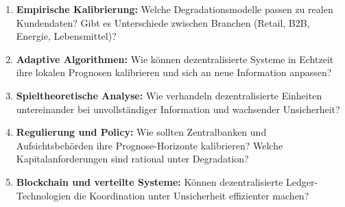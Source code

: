 \documentclass[12pt, a4paper, titlepage]{report}
\theoremstyle{definition}
\theoremstyle{remark}
\begin{document}
\begin{enumerate}
  \item \textbf{Empirische Kalibrierung:} Welche Degradationsmodelle passen zu realen Kundendaten? Gibt es Unterschiede zwischen Branchen (Retail, B2B, Energie, Lebensmittel)?
  
  \item \textbf{Adaptive Algorithmen:} Wie können dezentralisierte Systeme in Echtzeit ihre lokalen Prognosen kalibrieren und sich an neue Information anpassen?
  
  \item \textbf{Spieltheoretische Analyse:} Wie verhandeln dezentralisierte Einheiten untereinander bei unvollständiger Information und wachsender Unsicherheit?
  
  \item \textbf{Regulierung und Policy:} Wie sollten Zentralbanken und Aufsichtsbehörden ihre Prognose-Horizonte kalibrieren? Welche Kapitalanforderungen sind rational unter Degradation?
  
  \item \textbf{Blockchain und verteilte Systeme:} Können dezentralisierte Ledger-Technologien die Koordination unter Unsicherheit effizienter machen?
\end{enumerate}
\end{document}
